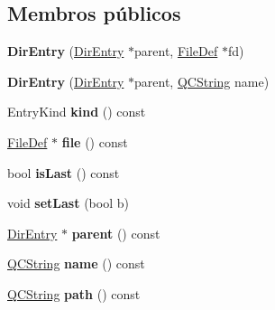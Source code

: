 \subsection*{Membros públicos}
\begin{DoxyCompactItemize}
\item 
\hypertarget{class_dir_entry_a07bb9cbc558c9aec87682b62e1e52185}{{\bfseries Dir\-Entry} (\hyperlink{class_dir_entry}{Dir\-Entry} $\ast$parent, \hyperlink{class_file_def}{File\-Def} $\ast$fd)}\label{class_dir_entry_a07bb9cbc558c9aec87682b62e1e52185}

\item 
\hypertarget{class_dir_entry_a8fa81e65af05f08ca59b2566564a0278}{{\bfseries Dir\-Entry} (\hyperlink{class_dir_entry}{Dir\-Entry} $\ast$parent, \hyperlink{class_q_c_string}{Q\-C\-String} name)}\label{class_dir_entry_a8fa81e65af05f08ca59b2566564a0278}

\item 
\hypertarget{class_dir_entry_a87b7ba4fd70b2ee4f02606c2d0a0cd8e}{Entry\-Kind {\bfseries kind} () const }\label{class_dir_entry_a87b7ba4fd70b2ee4f02606c2d0a0cd8e}

\item 
\hypertarget{class_dir_entry_a92e8e1e1c1e776ac3807f68236ab4b5a}{\hyperlink{class_file_def}{File\-Def} $\ast$ {\bfseries file} () const }\label{class_dir_entry_a92e8e1e1c1e776ac3807f68236ab4b5a}

\item 
\hypertarget{class_dir_entry_a8dad52a23ff99a58cb64461598a11d5c}{bool {\bfseries is\-Last} () const }\label{class_dir_entry_a8dad52a23ff99a58cb64461598a11d5c}

\item 
\hypertarget{class_dir_entry_a6a8a2e6b69f530395300f40677c59480}{void {\bfseries set\-Last} (bool b)}\label{class_dir_entry_a6a8a2e6b69f530395300f40677c59480}

\item 
\hypertarget{class_dir_entry_a5b986e9d888f90365f8957660e07cd18}{\hyperlink{class_dir_entry}{Dir\-Entry} $\ast$ {\bfseries parent} () const }\label{class_dir_entry_a5b986e9d888f90365f8957660e07cd18}

\item 
\hypertarget{class_dir_entry_af92302878527ec555ba9e3fe066925ff}{\hyperlink{class_q_c_string}{Q\-C\-String} {\bfseries name} () const }\label{class_dir_entry_af92302878527ec555ba9e3fe066925ff}

\item 
\hypertarget{class_dir_entry_a477fe63d10df1c3d9675d8652b7bcfa4}{\hyperlink{class_q_c_string}{Q\-C\-String} {\bfseries path} () const }\label{class_dir_entry_a477fe63d10df1c3d9675d8652b7bcfa4}

\end{DoxyCompactItemize}
